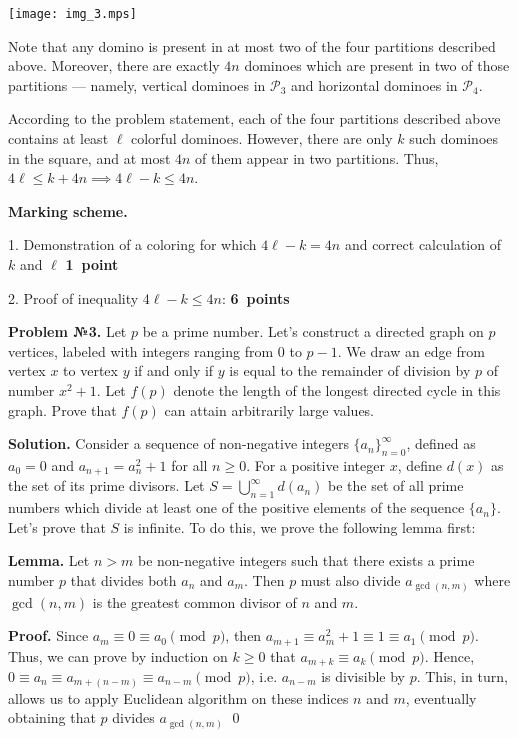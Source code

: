 \documentclass[12pt]{article}
\newcounter{problem}
\def\avtor#1{\linebreak[2] \hspace*{\fill}{\small (\mbox{\textit{#1})}}}
\def \Problem#1{\par \bigskip \textbf{Problem №{#1}. }}
\def \solution{\par \bigskip \textbf{Solution. }}
\def \Lemma{\par \bigskip \textbf{Lemma. }}
\def \proof{\par \bigskip \textbf{Proof. }}
\def \marking{\par \bigskip \textbf{Marking scheme. }}
\def\geq{\geqslant}
\def\leq{\leqslant}
\begin{document}
\medskip
\centerline{\texttt{[image: img\_3.mps]}}
\medskip

Note that any domino is present in at most two of the four partitions described above. Moreover, there are exactly $4n$ dominoes which are present in two of those partitions --- namely, vertical dominoes in $\mathcal P_3$ and horizontal dominoes in $\mathcal P_4$.

According to the problem statement, each of the four partitions described above contains at least $\ell$ colorful dominoes. However, there are only $k$ such dominoes in the square, and at most $4n$ of them appear in two partitions. Thus, $4 \ell \leq k + 4n \implies 4 \ell - k \leq 4n$.

\marking

1. Demonstration of a coloring for which $4 \ell - k = 4n$ and correct calculation of $k$ and $\ell$ \dotfill\textbf{1~point}

2. Proof of inequality $4 \ell - k \leq 4n$: \dotfill\textbf{6~points}


\Problem{3} Let $p$ be a prime number. Let's construct a directed graph on $p$ vertices, labeled with integers ranging from $0$ to $p - 1$. We draw an edge from vertex $x$ to vertex $y$ if and only if $y$ is equal to the remainder of division by $p$ of number $x^2 + 1$. Let $f(p)$ denote the length of the longest directed cycle in this graph. Prove that $f(p)$ can attain arbitrarily large values. \avtor{Zimanov~А.}

\solution Consider a sequence of non-negative integers $\{ a_n \}_{n = 0}^{\infty}$, defined as $a_0 = 0$ and $a_{n + 1} = a_{n}^2 + 1$ for all $n \geq 0$. For a positive integer $x$, define $d(x)$ as the set of its prime divisors. Let $S = \bigcup_{n = 1}^{\infty} d(a_n)$ be the set of all prime numbers which divide at least one of the positive elements of the sequence $\{ a_n \}$. Let's prove that $S$ is infinite. To do this, we prove the following lemma first:

\Lemma Let $n > m$ be non-negative integers such that there exists a prime number $p$ that divides both $a_n$ and $a_m$. Then $p$ must also divide $a_{\gcd(n, m)}$ where $\gcd(n, m)$ is the greatest common divisor of $n$ and $m$.

\proof Since $a_m \equiv 0 \equiv a_0 \pmod{p}$, then $a_{m + 1} \equiv a_{m}^2 + 1 \equiv 1 \equiv a_{1} \pmod{p}$. Thus, we can prove by induction on $k \geq 0$ that $a_{m + k} \equiv a_{k} \pmod{p}$. Hence, $0 \equiv a_{n} \equiv a_{m + (n - m)} \equiv a_{n - m} \pmod{p}$, i.e. $a_{n - m}$ is divisible by $p$. This, in turn, allows us to apply Euclidean algorithm on these indices $n$ and $m$, eventually obtaining that $p$ divides $a_{\gcd(n, m)}$
\qed
\end{document}
